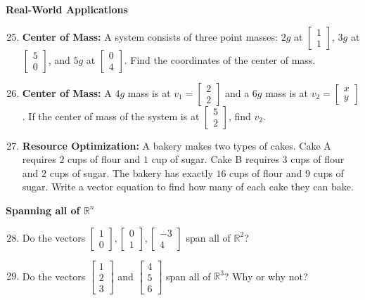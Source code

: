 \documentclass[12pt]{article}
\begin{document}
\textbf{Real-World Applications}
\begin{enumerate}
\setcounter{enumi}{24}
    \item \textbf{Center of Mass:} A system consists of three point masses: $2g$ at $\begin{bmatrix} 1 \\ 1 \end{bmatrix}$, $3g$ at $\begin{bmatrix} 5 \\ 0 \end{bmatrix}$, and $5g$ at $\begin{bmatrix} 0 \\ 4 \end{bmatrix}$. Find the coordinates of the center of mass.
    \item \textbf{Center of Mass:} A $4g$ mass is at $v_1 = \begin{bmatrix} 2 \\ 2 \end{bmatrix}$ and a $6g$ mass is at $v_2 = \begin{bmatrix} x \\ y \end{bmatrix}$. If the center of mass of the system is at $\begin{bmatrix} 5 \\ 2 \end{bmatrix}$, find $v_2$.
    \item \textbf{Resource Optimization:} A bakery makes two types of cakes. Cake A requires $2$ cups of flour and $1$ cup of sugar. Cake B requires $3$ cups of flour and $2$ cups of sugar. The bakery has exactly $16$ cups of flour and $9$ cups of sugar. Write a vector equation to find how many of each cake they can bake. 
\end{enumerate}

\textbf{Spanning all of $\mathbb{R}^n$}
\begin{enumerate}
\setcounter{enumi}{27}
    \item Do the vectors $\begin{bmatrix} 1 \\ 0 \end{bmatrix}, \begin{bmatrix} 0 \\ 1 \end{bmatrix}, \begin{bmatrix} -3 \\ 4 \end{bmatrix}$ span all of $\mathbb{R}^2$?
    \item Do the vectors $\begin{bmatrix} 1 \\ 2 \\ 3 \end{bmatrix}$ and $\begin{bmatrix} 4 \\ 5 \\ 6 \end{bmatrix}$ span all of $\mathbb{R}^3$? Why or why not?
\end{enumerate}
\end{document}
